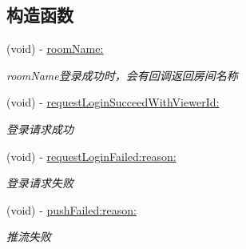 \subsection*{构造函数}
\begin{DoxyCompactItemize}
\item 
\mbox{\label{protocol_c_c_push_util_delegate_01-p_a801c02b63ee0bb894529aaf2b947a697}} 
(void) -\/ \hyperlink{protocol_c_c_push_util_delegate_01-p_a801c02b63ee0bb894529aaf2b947a697}{room\+Name\+:}
\begin{DoxyCompactList}\small\item\em room\+Name登录成功时，会有回调返回房间名称 \end{DoxyCompactList}\item 
\mbox{\label{protocol_c_c_push_util_delegate_01-p_a3b3b62ec6d1afd33c29fcec6d36b2560}} 
(void) -\/ \hyperlink{protocol_c_c_push_util_delegate_01-p_a3b3b62ec6d1afd33c29fcec6d36b2560}{request\+Login\+Succeed\+With\+Viewer\+Id\+:}
\begin{DoxyCompactList}\small\item\em 登录请求成功 \end{DoxyCompactList}\item 
\mbox{\label{protocol_c_c_push_util_delegate_01-p_abe40a1801f00e0c23b772a9c5f67dbce}} 
(void) -\/ \hyperlink{protocol_c_c_push_util_delegate_01-p_abe40a1801f00e0c23b772a9c5f67dbce}{request\+Login\+Failed\+:reason\+:}
\begin{DoxyCompactList}\small\item\em 登录请求失败 \end{DoxyCompactList}\item 
\mbox{\label{protocol_c_c_push_util_delegate_01-p_aa5f407ffe96a448cb03c7c1f534f1b0f}} 
(void) -\/ \hyperlink{protocol_c_c_push_util_delegate_01-p_aa5f407ffe96a448cb03c7c1f534f1b0f}{push\+Failed\+:reason\+:}
\begin{DoxyCompactList}\small\item\em 推流失败 \end{DoxyCompactList}\item 
\mbox{\label{protocol_c_c_push_util_delegate_01-p_a90d9ba4687cbdbca67be786ebbecda25}} 

\end{DoxyCompactItemize}

